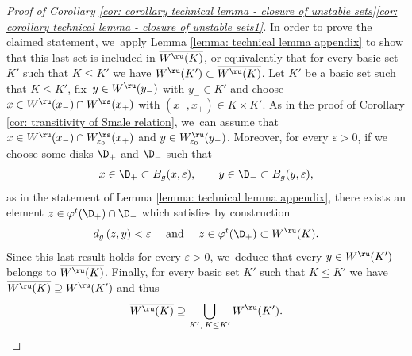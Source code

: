 \begin{appendix}
\begin{proof}[Proof of Corollary \ref{cor: corollary technical lemma - closure of unstable sets}\eqref{cor: corollary technical lemma - closure of unstable sets1}]
In order to prove the claimed statement, we~apply Lemma \ref{lemma: technical lemma appendix} to show that this last set is included in $\overline{W^\ru (K)}$, or equivalently that for every basic set $K'$ such that $K \leq K'$ we have $W^\ru (K') \subset \overline{W^\ru (K)}$. Let $K'$ be a basic set such that $K \leq K'$, fix~$y \in W^\ru (y_-)$ with $y_- \in K'$ and choose $x \in W^\ru (x_-) \cap W^\rs (x_+)$ with $(x_-, x_+) \in K \times K'$. As in the proof of Corollary \ref{cor: transitivity of Smale relation}, we~can assume that $x \in W^\ru (x_-) \cap W_{\varepsilon_0}^\rs (x_+)$ and $y \in W_{\varepsilon_0}^\ru (y_-)$. Moreover, for every $\varepsilon > 0$, if we choose some disks $\D_+$ and $\D_-$ such that
\[
x \in \D_+ \subset B_g (x, \varepsilon), \qquad y \in \D_- \subset B_g (y, \varepsilon),
\]
as in the statement of Lemma \ref{lemma: technical lemma appendix}, there exists an element $z \in \varphi^t (\D_{+}) \cap \D_{-}$ which satisfies by construction
\[
d_g \left(z, y \right) < \varepsilon \quad\text{ and }\quad z \in \varphi^t (\D_{+}) \subset W^\ru (K).
\]
Since this last result holds for every $\varepsilon > 0$, we~deduce that every $y \in W^\ru (K')$ belongs to $\overline{W^\ru (K)}$. Finally, for every basic set $K'$ such that $K\leq K'$ we have $\overline{W^\ru (K)} \supseteq W^\ru (K')$ and thus
\[
\overline{W^\ru (K)} \supseteq \bigcup_{K', \: K \leq K'} W^\ru (K').\qedhere
\]
\end{proof}


\end{appendix}
